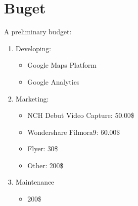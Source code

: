 \documentclass[letterpaper,11pt]{article}
\begin{document}
\section{Buget}
A preliminary budget: 
\begin{enumerate}
    \item Developing:
    \begin{itemize}
        \item Google Maps Platform
        \item Google Analytics
    \end{itemize}
    \item Marketing:
    \begin{itemize}
        \item NCH Debut Video Capture: 50.00\$
        \item Wondershare Filmora9: 60.00\$
        \item Flyer: 30\$
        \item Other: 200\$
    \end{itemize}
    \item Maintenance
    \begin{itemize}
        \item 200\$
    \end{itemize}

\end{enumerate}
\end{document}

